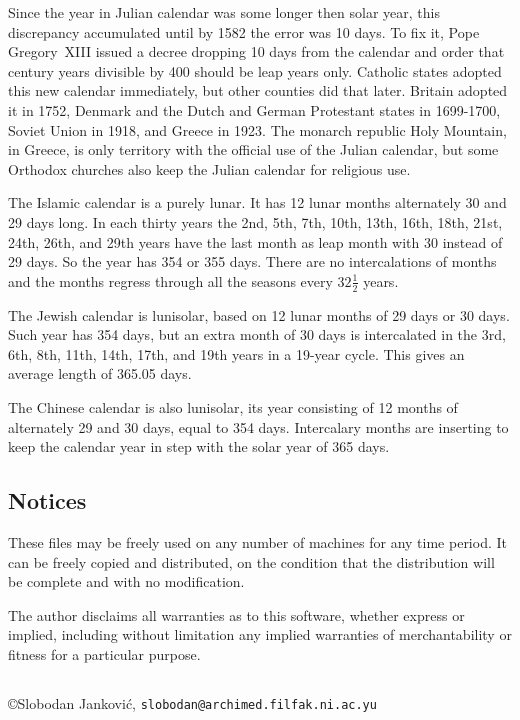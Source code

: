 \documentclass{article}
\begin{document}
Since the year in Julian calendar was some longer then solar year, this discrepancy accumulated
until by 1582 the error was 10 days. To fix it, Pope Gregory~XIII issued a decree dropping 10 days
from the calendar and order that century years divisible by 400 should be leap years only. Catholic
states adopted this new calendar immediately, but other counties did that later. Britain adopted it
in 1752, Denmark and the Dutch and German Protestant states in 1699-1700, Soviet Union in 1918, and
Greece in 1923. The monarch republic Holy Mountain, in Greece, is only territory with the official
use of the Julian calendar, but some Orthodox churches also keep the Julian calendar for religious
use.

The Islamic calendar is a purely lunar. It has 12 lunar months alternately 30 and 29 days long. In
each thirty years the 2nd, 5th, 7th, 10th, 13th, 16th, 18th, 21st, 24th, 26th, and 29th years have
the last month as leap month with 30 instead of 29 days. So the year has 354 or 355 days. There are
no intercalations of months and the months regress through all the seasons every $32\frac12$ years.

The Jewish calendar is lunisolar, based on 12 lunar months of 29 days or 30 days. Such year has 354
days, but an extra month of 30 days is intercalated in the 3rd, 6th, 8th, 11th, 14th, 17th, and
19th years in a 19-year cycle. This gives an average length of 365.05 days.

The Chinese calendar is also lunisolar, its year consisting of 12 months of alternately 29 and 30
days, equal to 354 days. Intercalary months are inserting to keep the calendar year in step with
the solar year of 365 days.

\subsection*{Notices}

These files may be freely used on any number of machines for any time period. It can be freely
copied and distributed, on the condition that the distribution will be complete and with no
modification.

The author disclaims all warranties as to this software, whether express or implied, including
without limitation any implied warranties of merchantability or fitness for a particular purpose.

\subsection*{}
\copyright Slobodan Jankovi\'c, \texttt{slobodan@archimed.filfak.ni.ac.yu}
\end{document}

